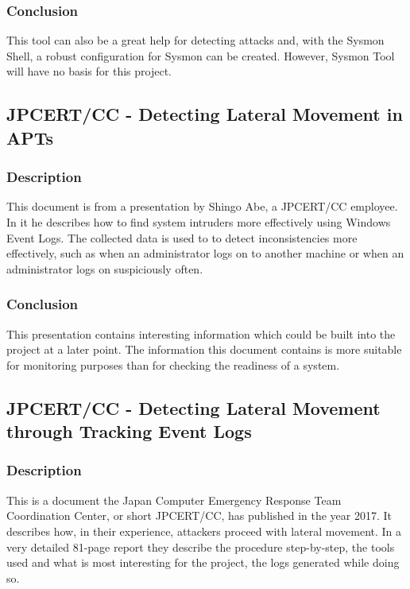 \subsubsection{Conclusion}
This tool can also be a great help for detecting attacks and, with the Sysmon Shell, a robust configuration for Sysmon can be created. However, Sysmon Tool will have no basis for this project.

\subsection{JPCERT/CC - Detecting Lateral Movement in APTs} \label{DetectingLateral}
\subsubsection{Description}
This document \cite{Abe2016} is from a presentation by Shingo Abe, a JPCERT/CC employee. In it he describes how to find system intruders more effectively using Windows Event Logs. The collected data is used to to detect inconsistencies more effectively, such as when an administrator logs on to another machine or when an administrator logs on suspiciously often. 
\subsubsection{Conclusion}
This presentation contains interesting information which could be built into the project at a later point. The information this document contains is more suitable for monitoring purposes than for checking the readiness of a system.

\subsection{JPCERT/CC - Detecting Lateral Movement through Tracking Event Logs}\label{JPCertStudy}
\subsubsection{Description}
This is a document \cite{JPCERTDetectingLateralMovement} the Japan Computer Emergency Response Team Coordination Center, or short JPCERT/CC, has published in the year 2017. It describes how, in their experience, attackers proceed with lateral movement. In a very detailed 81-page report they describe the procedure step-by-step, the tools used and what is most interesting for the project, the logs generated while doing so.
